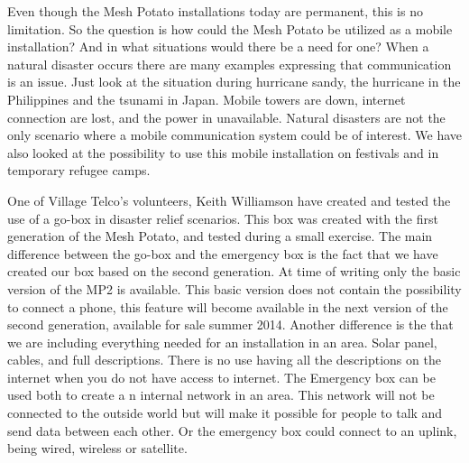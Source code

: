 Even though the Mesh Potato installations today are permanent, this is no limitation. So the question is how could the Mesh Potato be utilized as a mobile installation? And in what situations would there be a need for one? When a natural disaster occurs there are many examples expressing that communication is an issue. Just look at the situation during hurricane sandy, the hurricane in the Philippines and the tsunami in Japan. Mobile towers are down, internet connection are lost, and the power in unavailable. Natural disasters are not the only scenario where a mobile communication system could be of interest. We have also looked at the possibility to use this mobile installation on festivals and in temporary refugee camps. 

One of Village Telco's volunteers, Keith Williamson have created and tested the use of a go-box in disaster relief scenarios. This box was created with the first generation of the Mesh Potato, and tested during a small exercise. The main difference between the go-box and the emergency box is the fact that we have created our box based on the second generation. At time of writing only the basic version of the MP2 is available. This basic version does not contain the possibility to connect a phone, this feature will become available in the next version of the second generation, available for sale summer 2014. Another difference is the that we are including everything needed for an installation in an area. Solar panel, cables, and full descriptions. There is no use having all the descriptions on the internet when you do not have access to internet. The Emergency box can be used both to create a n internal network in an area. This network will not be connected to the outside world but will make it possible for people to talk and send data between each other. Or the emergency box could connect to an uplink, being wired, wireless or satellite. 




 




